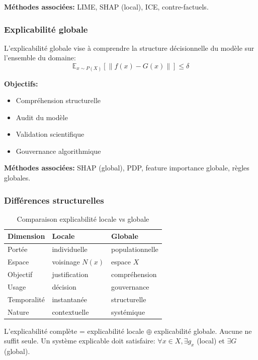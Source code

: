 \textbf{Méthodes associées:} LIME, SHAP (local), ICE, contre-factuels.

\subsubsection{Explicabilité globale}

L’explicabilité globale vise à comprendre la structure décisionnelle du modèle sur l'ensemble du domaine:
\[
\mathbb{E}_{x \sim P(X)} [ \| f(x) - G(x) \| ] \leq \delta
\]

\textbf{Objectifs:}
\begin{itemize}
    \item Compréhension structurelle
    \item Audit du modèle
    \item Validation scientifique
    \item Gouvernance algorithmique
\end{itemize}

\textbf{Méthodes associées:} SHAP (global), PDP, feature importance globale, règles globales.

\subsubsection{Différences structurelles}

\begin{table}[h!]
\centering
\caption{Comparaison explicabilité locale vs globale}
\label{tab:local_vs_global}
\renewcommand{\arraystretch}{1.4}
\begin{tabularx}{\textwidth}{lXX}
\toprule
\textbf{Dimension} & \textbf{Locale} & \textbf{Globale} \\
\midrule
Portée & individuelle & populationnelle \\
Espace & voisinage $N(x)$ & espace $X$ \\
Objectif & justification & compréhension \\
Usage & décision & gouvernance \\
Temporalité & instantanée & structurelle \\
Nature & contextuelle & systémique \\
\hline
\end{tabularx}
\end{table}

\begin{pointcle}
L'explicabilité complète = explicabilité locale $\oplus$ explicabilité globale. Aucune ne suffit seule. Un système explicable doit satisfaire: $\forall x \in X, \exists g_x$ (local) et $\exists G$ (global).
\end{pointcle}

